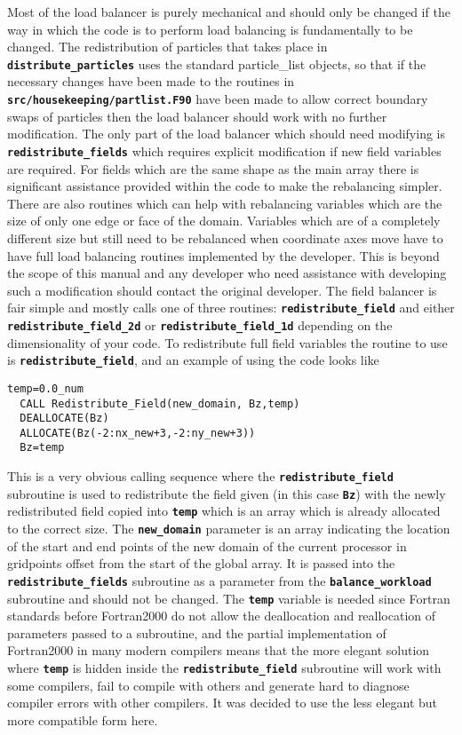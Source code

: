 \documentclass[12pt,a4paper]{article}
\newcommand{\simpleboxverbatim}{\begin{Verbatim}[obeytabs=true,frame=single,
  framerule=0.5mm,rulecolor=\color{warwickmid},formatcom=\color{black}]}
\newcommand{\inlinecode}[1]{{\color{warwickred} \bf\texttt{#1}}}
\begin{document}
Most of the load balancer is purely mechanical and should only be changed if
the way in which the code is to perform load balancing is fundamentally to be
changed. The redistribution of particles that takes place in
\inlinecode{distribute\_particles} uses the standard particle\_list objects, so
that if the necessary changes have been made to the routines in
\inlinecode{src/housekeeping/partlist.F90} have been made to allow correct
boundary swaps of particles then the load balancer should work with no further
modification. The only part of the load balancer which should need modifying is
\inlinecode{redistribute\_fields} which requires explicit modification if new
field variables are required. For fields which are the same shape as the main
array there is significant assistance provided within the code to make the
rebalancing simpler. There are also routines which can help with rebalancing
variables which are the size of only one edge or face of the domain. Variables
which are of a completely different size but still need to be rebalanced when
coordinate axes move have to have full load balancing routines implemented by
the developer. This is beyond the scope of this manual and any developer who
need assistance with developing such a modification should contact the original
developer. The field balancer is fair simple and mostly calls one of three
routines: \inlinecode{redistribute\_field} and either
\inlinecode{redistribute\_field\_2d} or \inlinecode{redistribute\_field\_1d}
depending on the dimensionality of your code. To redistribute full field
variables the routine to use is \inlinecode{redistribute\_field}, and an
example of using the code looks like

\simpleboxverbatim
  temp=0.0_num
  CALL Redistribute_Field(new_domain, Bz,temp)
  DEALLOCATE(Bz)
  ALLOCATE(Bz(-2:nx_new+3,-2:ny_new+3))
  Bz=temp
\end{Verbatim}

This is a very obvious calling sequence where the
\inlinecode{redistribute\_field} subroutine is used to redistribute the field
given (in this case \inlinecode{Bz}) with the newly redistributed field copied
into \inlinecode{temp} which is an array which is already allocated to the
correct size. The \inlinecode{new\_domain} parameter is an array indicating the
location of the start and end points of the new domain of the current processor
in gridpoints offset from the start of the global array. It is passed into the
\inlinecode{redistribute\_fields} subroutine as a parameter from the
\inlinecode{balance\_workload} subroutine and should not be changed. The
\inlinecode{temp} variable is needed since Fortran standards before Fortran2000
do not allow the deallocation and reallocation of parameters passed to a
subroutine, and the partial implementation of Fortran2000 in many modern
compilers means that the more elegant solution where \inlinecode{temp} is
hidden inside the \inlinecode{redistribute\_field} subroutine will work with
some compilers, fail to compile with others and generate hard to diagnose
compiler errors with other compilers. It was decided to use the less elegant
but more compatible form here.\\
\end{document}
